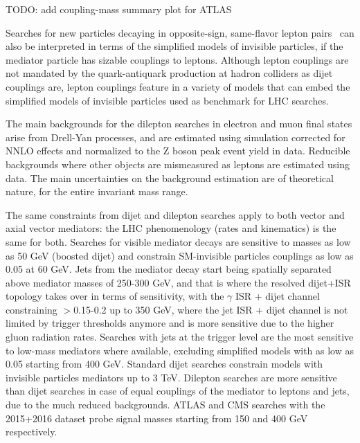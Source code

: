 TODO: add coupling-mass summary plot for ATLAS



Searches for new particles decaying in opposite-sign, same-flavor lepton pairs~\cite{Aaboud:2017buh,Khachatryan:2016zqb} can also be interpreted in terms of the simplified models of invisible particles, 
if the mediator particle has sizable couplings to leptons. Although lepton couplings
are not mandated by the quark-antiquark production at hadron colliders as dijet couplings are, 
lepton couplings feature in a variety of models that can embed
the simplified models of invisible particles used as benchmark for LHC searches. %

The main backgrounds for the dilepton searches in electron and muon final states 
arise from Drell-Yan processes, and are estimated using simulation corrected for NNLO effects and normalized to the Z boson peak event yield in data. 
Reducible backgrounds where other objects are mismeasured as leptons are estimated using data. The main uncertainties on the background estimation are of theoretical nature, for the entire invariant mass range. 

The same constraints from dijet and dilepton searches apply to both vector and axial vector mediators:
the LHC phenomenology (rates and kinematics) is the same for both. Searches for visible mediator decays 
are sensitive to masses as low as 50 GeV (boosted dijet) and constrain SM-invisible particles couplings \gq as low as 
0.05 at 60 GeV. Jets from the mediator decay start being spatially separated above mediator masses of 250-300 GeV, 
and that is where the resolved dijet+ISR topology takes over in terms of sensitivity, with the $\gamma$ ISR + dijet channel
constraining \gq$>$0.15-0.2 up to 350 GeV, where the jet ISR + dijet channel is not limited by
trigger thresholds anymore and is more sensitive due to the higher gluon radiation rates.
Searches with jets at the trigger level are the most sensitive to low-mass mediators where available,
excluding simplified models with \gq as low as 0.05 starting from 400 GeV. 
Standard dijet searches constrain models with invisible particles mediators up to 3 TeV.  
Dilepton searches are more sensitive than dijet searches in case of equal couplings
of the mediator to leptons and jets, due to the much reduced backgrounds. ATLAS and CMS searches
with the 2015+2016 dataset probe signal masses starting from 150 and 400 GeV respectively.  

